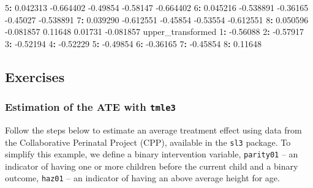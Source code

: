 \documentclass[12pt, krantz2,]{krantz}
\newenvironment{Shaded}{\begin{snugshade}}{\end{snugshade}}
\newcommand{\DecValTok}[1]{\textcolor[rgb]{0.06,0.06,0.06}{#1}}
\newcommand{\FloatTok}[1]{\textcolor[rgb]{0.06,0.06,0.06}{#1}}
\newcommand{\NormalTok}[1]{#1}
\newcommand{\OperatorTok}[1]{\textcolor[rgb]{0.43,0.43,0.43}{\textbf{#1}}}
\newcommand{\StringTok}[1]{\textcolor[rgb]{0.5,0.5,0.5}{#1}}
\theoremstyle{definition}
\theoremstyle{definition}
\theoremstyle{definition}
\newcommand{\1}{\mathbbm{1}}
\begin{document}
\begin{Shaded}
\begin{Highlighting}[]
\DecValTok{5}\OperatorTok{:}\StringTok{ }\FloatTok{0.042313} \FloatTok{-0.664402} \FloatTok{-0.49854}        \FloatTok{-0.58147}         \FloatTok{-0.664402}
\DecValTok{6}\OperatorTok{:}\StringTok{ }\FloatTok{0.045216} \FloatTok{-0.538891} \FloatTok{-0.36165}        \FloatTok{-0.45027}         \FloatTok{-0.538891}
\DecValTok{7}\OperatorTok{:}\StringTok{ }\FloatTok{0.039290} \FloatTok{-0.612551} \FloatTok{-0.45854}        \FloatTok{-0.53554}         \FloatTok{-0.612551}
\DecValTok{8}\OperatorTok{:}\StringTok{ }\FloatTok{0.050596} \FloatTok{-0.081857}  \FloatTok{0.11648}         \FloatTok{0.01731}         \FloatTok{-0.081857}
\NormalTok{   upper_transformed}
\DecValTok{1}\OperatorTok{:}\StringTok{          }\FloatTok{-0.56088}
\DecValTok{2}\OperatorTok{:}\StringTok{          }\FloatTok{-0.57917}
\DecValTok{3}\OperatorTok{:}\StringTok{          }\FloatTok{-0.52194}
\DecValTok{4}\OperatorTok{:}\StringTok{          }\FloatTok{-0.52229}
\DecValTok{5}\OperatorTok{:}\StringTok{          }\FloatTok{-0.49854}
\DecValTok{6}\OperatorTok{:}\StringTok{          }\FloatTok{-0.36165}
\DecValTok{7}\OperatorTok{:}\StringTok{          }\FloatTok{-0.45854}
\DecValTok{8}\OperatorTok{:}\StringTok{           }\FloatTok{0.11648}
\end{Highlighting}
\end{Shaded}

\hypertarget{exercises-1}{%
\subsection{Exercises}\label{exercises-1}}

\hypertarget{tmle3-ex1}{%
\subsubsection{\texorpdfstring{Estimation of the ATE with \texttt{tmle3}}{Estimation of the ATE with tmle3}}\label{tmle3-ex1}}

Follow the steps below to estimate an average treatment effect using data from
the Collaborative Perinatal Project (CPP), available in the \texttt{sl3} package. To
simplify this example, we define a binary intervention variable, \texttt{parity01} --
an indicator of having one or more children before the current child and a
binary outcome, \texttt{haz01} -- an indicator of having an above average height for
age.
\end{document}
